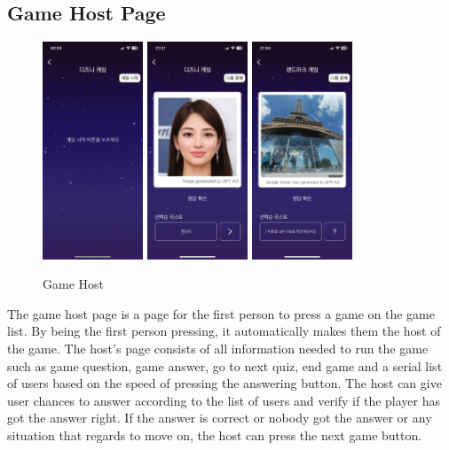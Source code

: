 \documentclass[conference]{IEEEtran}
\begin{document}
    \subsection{Game Host Page}
        \begin{figure}[htbp]
            \centerline{\includegraphics[width=3cm]{Images/screen/game/GAME_STANDBY.PNG}
            \includegraphics[width=3cm]{Images/screen/game/disney/DISNEY1_HOST.PNG}
            \includegraphics[width=3cm]{Images/screen/game/geo/GEO1_HOST.PNG}}
            \caption{Game Host}
            \label{fig}
        \end{figure}
        The game host page is a page for the first person to press a game on the game list. By being the first person pressing, it automatically makes them the host of the game. The host’s page consists of all information needed to run the game such as game question, game answer, go to next quiz, end game and a serial list of users based on the speed of pressing the answering button. The host can give user chances to answer according to the list of users and verify if the player has got the answer right. If the answer is correct or nobody got the answer or any situation that regards to move on, the host can press the next game button.\\
\end{document}

